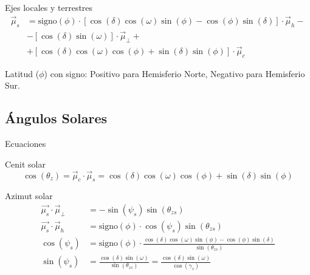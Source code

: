 \documentclass[xcolor={usenames,svgnames,dvipsnames}]{beamer}
\begin{document}
\begin{frame}[label={sec:org3cd0b38}]{Ejes locales y terrestres}
\begin{align*}
  \vec{\mu}_{s} &= \mathrm{signo}(\phi)\cdot\left[\cos\left(\delta\right)\cos\left(\omega\right)\sin\left(\phi\right)-\cos\left(\phi\right)\sin\left(\delta\right)\right]\cdot\vec{\mu}_{h}-\\
  &- \left[\cos\left(\delta\right)\sin\left(\omega\right)\right]\cdot\vec{\mu}_{\bot}+\\
  &+ \left[\cos\left(\delta\right)\cos\left(\omega\right)\cos\left(\phi\right)+\sin\left(\delta\right)\sin\left(\phi\right)\right]\cdot\vec{\mu}_{c} 
\end{align*}


\alert{Latitud (\(\phi\)) con signo}: Positivo para Hemisferio Norte, Negativo para Hemisferio Sur.
\end{frame}

\subsection{Ángulos Solares}
\label{sec:orge25edea}

\begin{frame}[label={sec:org5301857}]{Ecuaciones}
\begin{block}{Cenit solar}
\[\cos\left(\theta_{z}\right)=\vec{\mu}_{c}\cdot\vec{\mu}_{s}=\cos\left(\delta\right)\cos\left(\omega\right)\cos\left(\phi\right)+\sin\left(\delta\right)\sin\left(\phi\right)\]
\end{block}

\begin{block}{Azimut solar}
\begin{align*}
  \vec{\mu_{s}}\cdot\vec{\mu}_{\bot} &=-\sin\left(\psi_{s}\right)\sin\left(\theta_{zs}\right)\\
  \vec{\mu_{s}}\cdot\vec{\mu}_{h} &=\mathrm{signo}(\phi)\cdot\cos\left(\psi_{s}\right)\sin\left(\theta_{zs}\right)\\
  \cos\left(\psi_{s}\right) &= \mathrm{signo}(\phi)\cdot\frac{\cos\left(\delta\right)\cos\left(\omega\right)\sin\left(\phi\right)-\cos\left(\phi\right)\sin\left(\delta\right)}{\sin\left(\theta_{zs}\right)}\\
  \sin(\psi_{s}) &=\frac{\cos(\delta)\sin(\omega)}{\sin(\theta_{zs})}=\frac{\cos(\delta)\sin(\omega)}{\cos(\gamma_{s})}
\end{align*}
\end{block}
\end{frame}
\end{document}
